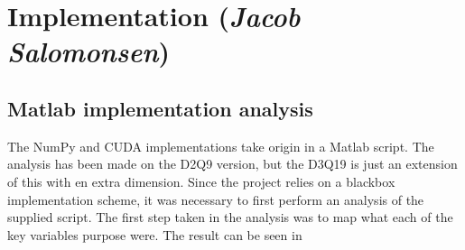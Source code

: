 \section{Implementation (\textit{Jacob Salomonsen})}


\subsection{Matlab implementation analysis}
The NumPy and CUDA implementations take origin in a Matlab script. The analysis has been made on the D2Q9 version, but the D3Q19 is just an extension of this with en extra dimension. Since the project relies on a blackbox implementation scheme, it was necessary to first perform an analysis of the supplied script. The first step taken in the analysis was to map what each of the key variables purpose were. The result can be seen in 


